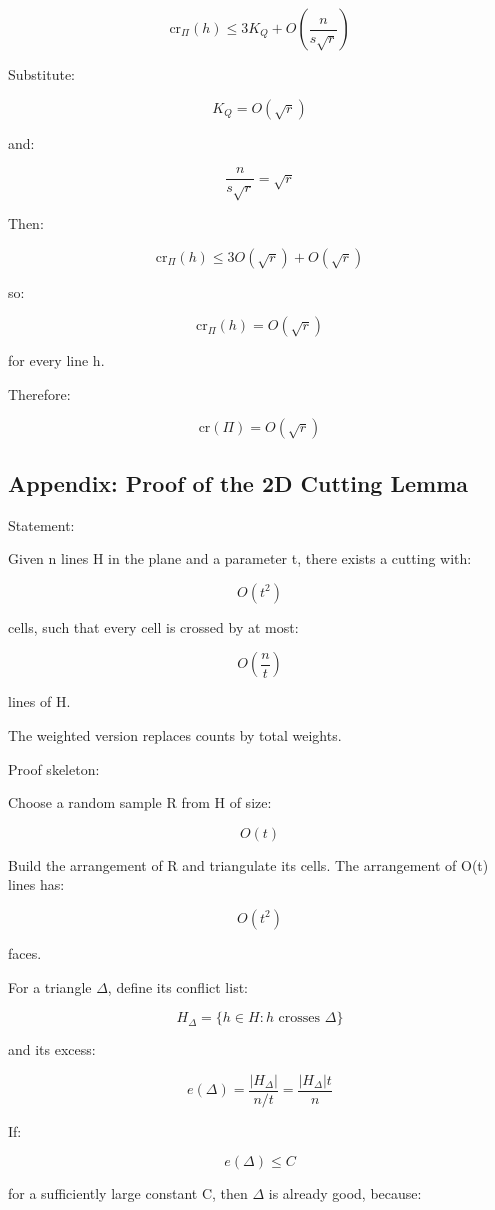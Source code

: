 \documentclass[
  11pt,
]{article}
\begin{document}
\[
\mathrm{cr}_\Pi(h) \le 3K_Q + O\left(\frac{n}{s\sqrt r}\right)
\]

Substitute:

\[
K_Q=O(\sqrt r)
\]

and:

\[
\frac{n}{s\sqrt r} = \sqrt r
\]

Then:

\[
\mathrm{cr}_\Pi(h) \le 3O(\sqrt r)+O(\sqrt r)
\]

so:

\[
\mathrm{cr}_\Pi(h)=O(\sqrt r)
\]

for every line h.

Therefore:

\[
\mathrm{cr}(\Pi)=O(\sqrt r)
\]

\hypertarget{appendix-proof-of-the-2d-cutting-lemma}{%
\subsection{Appendix: Proof of the 2D Cutting
Lemma}\label{appendix-proof-of-the-2d-cutting-lemma}}

Statement:

Given n lines H in the plane and a parameter t, there exists a cutting
with:

\[
O(t^2)
\]

cells, such that every cell is crossed by at most:

\[
O\left(\frac nt\right)
\]

lines of H.

The weighted version replaces counts by total weights.

Proof skeleton:

Choose a random sample R from H of size:

\[
O(t)
\]

Build the arrangement of R and triangulate its cells. The arrangement of
O(t) lines has:

\[
O(t^2)
\]

faces.

For a triangle \(\Delta\), define its conflict list:

\[
H_\Delta=\{h\in H:h\text{ crosses }\Delta\}
\]

and its excess:

\[
e(\Delta)=\frac{|H_\Delta|}{n/t}=\frac{|H_\Delta|t}{n}
\]

If:

\[
e(\Delta)\le C
\]

for a sufficiently large constant C, then \(\Delta\) is already good,
because:
\end{document}
